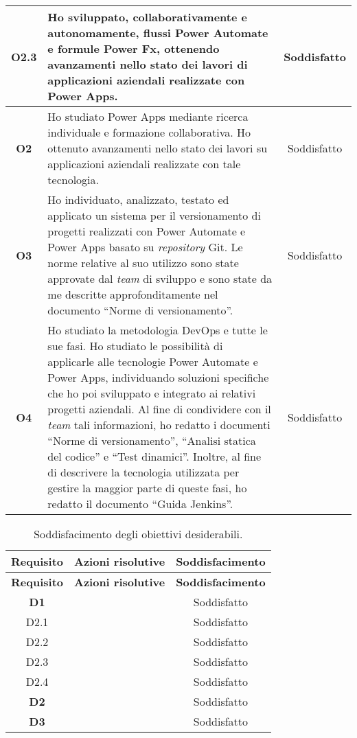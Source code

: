 \begin{longtable}{|c|p{7cm}|c|}
    \hline O2.3  & Ho sviluppato, collaborativamente e autonomamente, flussi Power Automate e formule Power Fx, ottenendo avanzamenti nello stato dei lavori di applicazioni aziendali realizzate con Power Apps. & Soddisfatto\\
    \hline \textbf{O2}  & Ho studiato Power Apps mediante ricerca individuale e formazione collaborativa. Ho ottenuto avanzamenti nello stato dei lavori su applicazioni aziendali realizzate con tale tecnologia. & Soddisfatto\\
    \hline \textbf{O3}  & Ho individuato, analizzato, testato ed applicato un sistema per il versionamento di progetti realizzati con Power Automate e Power Apps basato su \emph{repository} Git. Le norme relative al suo utilizzo sono state approvate dal \emph{team} di sviluppo e sono state da me descritte approfonditamente nel documento “Norme di versionamento”. & Soddisfatto\\
    \hline \textbf{O4}  & Ho studiato la metodologia \gls{DevOps} e tutte le sue fasi. Ho studiato le possibilità di applicarle alle tecnologie Power Automate e Power Apps, individuando soluzioni specifiche che ho poi sviluppato e integrato ai relativi progetti aziendali. Al fine di condividere con il \emph{team} tali informazioni, ho redatto i documenti “Norme di versionamento”, “Analisi statica del codice” e “Test dinamici”. Inoltre, al fine di descrivere la tecnologia utilizzata per gestire la maggior parte di queste fasi, ho redatto il documento “Guida Jenkins”. & Soddisfatto\\
\end{longtable}

\begin{longtable}{|c|p{7cm}|c|}
    \caption{Soddisfacimento degli obiettivi desiderabili.}
    \label{tab:soddObbDesiderabili}\\
    \hline \textbf{Requisito} & \textbf{Azioni risolutive} & \textbf{Soddisfacimento}\\ \endfirsthead
    \hline \textbf{Requisito} & \textbf{Azioni risolutive} & \textbf{Soddisfacimento}\\ \endhead
    \hline \endfoot
    \hline \endlastfoot
    \textbf{D1}  & & Soddisfatto\\
    \hline D2.1  & & Soddisfatto\\
    \hline D2.2  & & Soddisfatto\\
    \hline D2.3  & & Soddisfatto\\
    \hline D2.4  & & Soddisfatto\\
    \hline \textbf{D2}  & & Soddisfatto\\
    \hline \textbf{D3}  & & Soddisfatto\\
\end{longtable}

